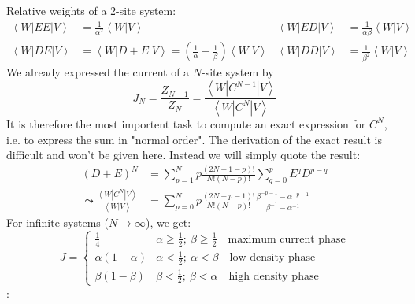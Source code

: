 Relative weights of a 2-site system:
\begin{align*}
	\left\langle W\right| E E \left| V\right\rangle&=\frac{1}{\alpha^2}\left\langle W|V\right\rangle & \left\langle W\right| ED\left|V\right\rangle&=\frac{1}{\alpha\beta}\left\langle W|V\right\rangle\\
	\left\langle W\right| DE\left|V\right\rangle &=\left\langle W\right| D+E\left|V\right\rangle = \left(\frac{1}{\alpha}+\frac{1}{\beta}\right)\left\langle W | V\right\rangle & \left\langle W \right| DD \left| V\right\rangle &= \frac{1}{\beta^2}\left\langle W| V\right\rangle
\end{align*}
We already expressed the current of a $N$-site system by 
\begin{equation*}
	J_N=\frac{Z_{N-1}}{Z_N}=\frac{\left\langle W | C^{N-1}|V\right\rangle}{\left\langle W | C^N | V \right\rangle}
\end{equation*}
It is therefore the most importent task to compute an exact expression for $C^N$, i.e. to express the sum in "{}normal order"{}. The derivation of the exact result is difficult and won't be given here. Instead we will simply quote the result:
\begin{align*}
	(D+E)^N&=\sum\limits_{p=1}^N p\frac{(2N-1-p)!}{N!(N-p)!}\sum\limits_{q=0}^pE^qD^{p-q}\\
	\leadsto \frac{\left\langle W|C^N|V\right\rangle}{\left\langle W|V\right\rangle}&=\sum\limits_{p=0}^Np\frac{(2N-p-1)!}{N!(N-p)!}\frac{\beta^{-p-1}-\alpha^{-p-1}}{\beta^{-1}-\alpha^{-1}}
\end{align*}
For infinite systems ($N\to\infty$), we get:
\begin{equation*}
	J=\begin{cases} \frac{1}{4} & \alpha\geq\frac{1}{2};\ \beta\geq\frac{1}{2} \quad \text{maximum current phase} \\ \alpha(1-\alpha) & \alpha < \frac{1}{2};\ \alpha < \beta \quad \text{low density phase} \\ \beta(1-\beta) & \beta<\frac{1}{2};\ \beta<\alpha \quad \text{high density phase} \end{cases}
\end{equation*}
\textbf{\underline{}}:
